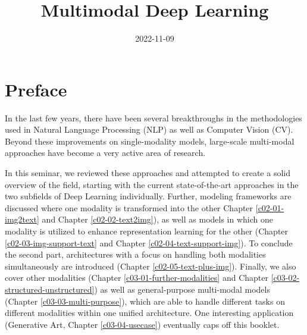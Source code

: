 \documentclass[
]{krantz}
\title{Multimodal Deep Learning}
\author{}
\date{\vspace{-2.5em}2022-11-09}
\begin{document}
\maketitle


\thispagestyle{empty}

\begin{center}
\end{center}

\setlength{\abovedisplayskip}{-5pt}
\setlength{\abovedisplayshortskip}{-5pt}

{
\hypersetup{linkcolor=}
\setcounter{tocdepth}{1}
\tableofcontents
}
\hypertarget{preface}{%
\chapter*{Preface}\label{preface}}


In the last few years, there have been several breakthroughs in the methodologies used in Natural Language Processing (NLP) as well as Computer Vision (CV). Beyond these improvements on single-modality models, large-scale multi-modal approaches have become a very active area of research.

In this seminar, we reviewed these approaches and attempted to create a solid overview of the field, starting with the current state-of-the-art approaches in the two subfields of Deep Learning individually. Further, modeling frameworks are discussed where one modality is transformed into the other Chapter \ref{c02-01-img2text} and Chapter \ref{c02-02-text2img}), as well as models in which one modality is utilized to enhance representation learning for the other (Chapter \ref{c02-03-img-support-text} and Chapter \ref{c02-04-text-support-img}). To conclude the second part, architectures with a focus on handling both modalities simultaneously are introduced (Chapter \ref{c02-05-text-plus-img}). Finally, we also cover other modalities (Chapter \ref{c03-01-further-modalities} and Chapter \ref{c03-02-structured-unstructured}) as well as general-purpose multi-modal models (Chapter \ref{c03-03-multi-purpose}), which are able to handle different tasks on different modalities within one unified architecture. One interesting application (Generative Art, Chapter \ref{c03-04-usecase}) eventually caps off this booklet.
\end{document}
